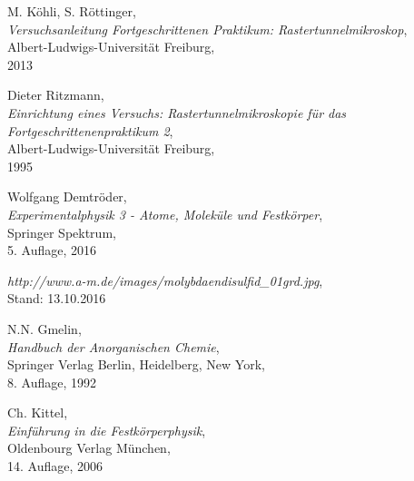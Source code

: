 \documentclass[12pt]{article}
\begin{document}

\newpage
\thispagestyle{empty}
\begin{thebibliography}{9}

  

  
  

M. Köhli, S. Röttinger,\\
\emph{Versuchsanleitung Fortgeschrittenen Praktikum: Rastertunnelmikroskop},\\
Albert-Ludwigs-Universität Freiburg,\\
2013

Dieter Ritzmann,\\
\emph{Einrichtung eines Versuchs: Rastertunnelmikroskopie für das Fortgeschrittenenpraktikum 2},\\
Albert-Ludwigs-Universität Freiburg,\\
1995

Wolfgang Demtröder,\\
\emph{Experimentalphysik 3 - Atome, Moleküle und Festkörper},\\
Springer Spektrum,\\
5. Auflage, 2016

\emph{http://www.a-m.de/images/molybdaendisulfid\_01grd.jpg},\\
Stand: 13.10.2016

N.N. Gmelin,\\
\emph{Handbuch der Anorganischen Chemie},\\
Springer Verlag Berlin, Heidelberg, New York,\\
8. Auflage, 1992

Ch. Kittel,\\
\emph{Einführung in die Festkörperphysik},\\
Oldenbourg Verlag München,\\
14. Auflage, 2006


\end{thebibliography}
\end{document}
